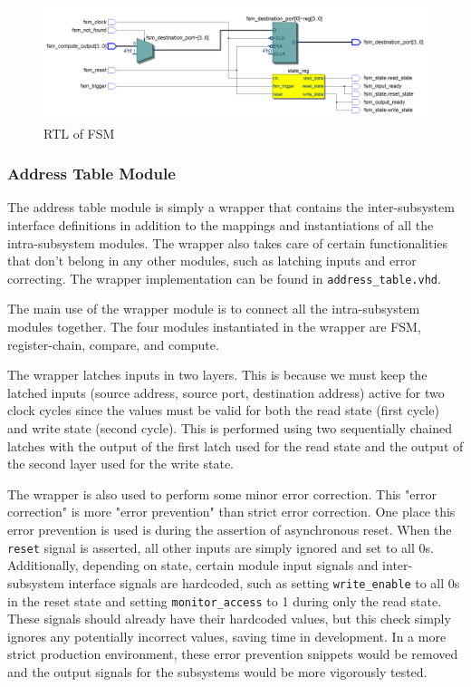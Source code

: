 \documentclass{article}
\begin{document}
\begin{figure}[ht!]
  \centering
    \includegraphics[width=1.0\textwidth]{fsm_rtl.PNG}
  \caption{RTL of FSM}
  \label{fig:fsm-rtl}
\end{figure}

\newpage
\subsubsection{Address Table Module}

The address table module is simply a wrapper that contains the inter-subsystem interface definitions in addition to the mappings and instantiations of all the intra-subsystem modules. The wrapper also takes care of certain functionalities that don't belong in any other modules, such as latching inputs and error correcting. The wrapper implementation can be found in \texttt{address\_table.vhd}.

The main use of the wrapper module is to connect all the intra-subsystem modules together. The four modules instantiated in the wrapper are FSM, register-chain, compare, and compute. 

The wrapper latches inputs in two layers. This is because we must keep the latched inputs (source address, source port, destination address) active for two clock cycles since the values must be valid for both the read state (first cycle) and write state (second cycle). This is performed using two sequentially chained latches with the output of the first latch used for the read state and the output of the second layer used for the write state.

The wrapper is also used to perform some minor error correction. This "error correction" is more "error prevention" than strict error correction. One place this error prevention is used is during the assertion of asynchronous reset. When the \texttt{reset} signal is asserted, all other inputs are simply ignored and set to all 0s. Additionally, depending on state, certain module input signals and inter-subsystem interface signals are hardcoded, such as setting \texttt{write\_enable} to all 0s in the reset state and setting \texttt{monitor\_access} to 1 during only the read state. These signals should already have their hardcoded values, but this check simply ignores any potentially incorrect values, saving time in development. In a more strict production environment, these error prevention snippets would be removed and the output signals for the subsystems would be more vigorously tested.
\end{document}
